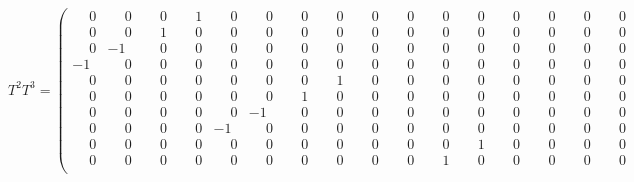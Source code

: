 \documentclass[10pt]{article}
\begin{document}
\[
T^{2}T^{3} = \left(\begin{smallmatrix}
\phantom{-}0 & \phantom{-}0 & \phantom{-}0 & \phantom{-}1 & \phantom{-}0 & \phantom{-}0 & \phantom{-}0 & \phantom{-}0 & \phantom{-}0 & \phantom{-}0 & \phantom{-}0 & \phantom{-}0 & \phantom{-}0 & \phantom{-}0 & \phantom{-}0 & \phantom{-}0 \\
\phantom{-}0 & \phantom{-}0 & \phantom{-}1 & \phantom{-}0 & \phantom{-}0 & \phantom{-}0 & \phantom{-}0 & \phantom{-}0 & \phantom{-}0 & \phantom{-}0 & \phantom{-}0 & \phantom{-}0 & \phantom{-}0 & \phantom{-}0 & \phantom{-}0 & \phantom{-}0 \\
\phantom{-}0 & -1 & \phantom{-}0 & \phantom{-}0 & \phantom{-}0 & \phantom{-}0 & \phantom{-}0 & \phantom{-}0 & \phantom{-}0 & \phantom{-}0 & \phantom{-}0 & \phantom{-}0 & \phantom{-}0 & \phantom{-}0 & \phantom{-}0 & \phantom{-}0 \\
-1 & \phantom{-}0 & \phantom{-}0 & \phantom{-}0 & \phantom{-}0 & \phantom{-}0 & \phantom{-}0 & \phantom{-}0 & \phantom{-}0 & \phantom{-}0 & \phantom{-}0 & \phantom{-}0 & \phantom{-}0 & \phantom{-}0 & \phantom{-}0 & \phantom{-}0 \\
\phantom{-}0 & \phantom{-}0 & \phantom{-}0 & \phantom{-}0 & \phantom{-}0 & \phantom{-}0 & \phantom{-}0 & \phantom{-}1 & \phantom{-}0 & \phantom{-}0 & \phantom{-}0 & \phantom{-}0 & \phantom{-}0 & \phantom{-}0 & \phantom{-}0 & \phantom{-}0 \\
\phantom{-}0 & \phantom{-}0 & \phantom{-}0 & \phantom{-}0 & \phantom{-}0 & \phantom{-}0 & \phantom{-}1 & \phantom{-}0 & \phantom{-}0 & \phantom{-}0 & \phantom{-}0 & \phantom{-}0 & \phantom{-}0 & \phantom{-}0 & \phantom{-}0 & \phantom{-}0 \\
\phantom{-}0 & \phantom{-}0 & \phantom{-}0 & \phantom{-}0 & \phantom{-}0 & -1 & \phantom{-}0 & \phantom{-}0 & \phantom{-}0 & \phantom{-}0 & \phantom{-}0 & \phantom{-}0 & \phantom{-}0 & \phantom{-}0 & \phantom{-}0 & \phantom{-}0 \\
\phantom{-}0 & \phantom{-}0 & \phantom{-}0 & \phantom{-}0 & -1 & \phantom{-}0 & \phantom{-}0 & \phantom{-}0 & \phantom{-}0 & \phantom{-}0 & \phantom{-}0 & \phantom{-}0 & \phantom{-}0 & \phantom{-}0 & \phantom{-}0 & \phantom{-}0 \\
\phantom{-}0 & \phantom{-}0 & \phantom{-}0 & \phantom{-}0 & \phantom{-}0 & \phantom{-}0 & \phantom{-}0 & \phantom{-}0 & \phantom{-}0 & \phantom{-}0 & \phantom{-}0 & \phantom{-}1 & \phantom{-}0 & \phantom{-}0 & \phantom{-}0 & \phantom{-}0 \\
\phantom{-}0 & \phantom{-}0 & \phantom{-}0 & \phantom{-}0 & \phantom{-}0 & \phantom{-}0 & \phantom{-}0 & \phantom{-}0 & \phantom{-}0 & \phantom{-}0 & \phantom{-}1 & \phantom{-}0 & \phantom{-}0 & \phantom{-}0 & \phantom{-}0 & \phantom{-}0 \\

\end{smallmatrix}\]
\end{document}
